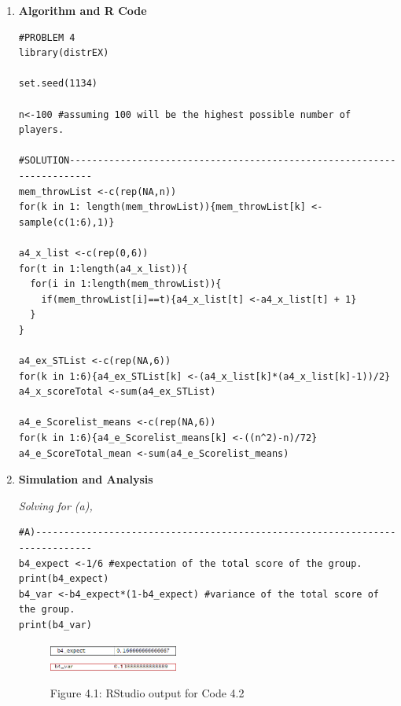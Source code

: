 \documentclass[12pt,letterpaper]{article}
\begin{document}
    
    \begin{enumerate}[label=\Alph*]
      \item \textbf{Algorithm and R Code}
      
      \begin{lstlisting}[title=\footnotesize Code 4.1: The Entire Code]
#PROBLEM 4
library(distrEX)

set.seed(1134)

n<-100 #assuming 100 will be the highest possible number of players.

#SOLUTION-----------------------------------------------------------------------
mem_throwList <-c(rep(NA,n))
for(k in 1: length(mem_throwList)){mem_throwList[k] <-sample(c(1:6),1)}

a4_x_list <-c(rep(0,6))
for(t in 1:length(a4_x_list)){
  for(i in 1:length(mem_throwList)){
    if(mem_throwList[i]==t){a4_x_list[t] <-a4_x_list[t] + 1}
  }
}

a4_ex_STList <-c(rep(NA,6))
for(k in 1:6){a4_ex_STList[k] <-(a4_x_list[k]*(a4_x_list[k]-1))/2}
a4_x_scoreTotal <-sum(a4_ex_STList)

a4_e_Scorelist_means <-c(rep(NA,6))
for(k in 1:6){a4_e_Scorelist_means[k] <-((n^2)-n)/72}
a4_e_ScoreTotal_mean <-sum(a4_e_Scorelist_means)

            \end{lstlisting}
          
        \vspace*{0.5cm}
        \item \textbf{Simulation and Analysis}
        
        \textit{Solving for (a),}
        \begin{lstlisting}[title=\footnotesize Code 4.2: Solving for (a)]
#A)-----------------------------------------------------------------------------
b4_expect <-1/6 #expectation of the total score of the group.
print(b4_expect)
b4_var <-b4_expect*(1-b4_expect) #variance of the total score of the group.
print(b4_var)
        \end{lstlisting}
    

    \begin{figure}[h]
      \centering
      \includegraphics[width=0.4\textwidth]{fig4.1.png}\\
      \includegraphics[width=0.4\textwidth]{fig4.1(1).png}
      \caption*{\footnotesize Figure 4.1: RStudio output for Code 4.2}
    \end{figure}
    

\end{enumerate}
\end{document}

